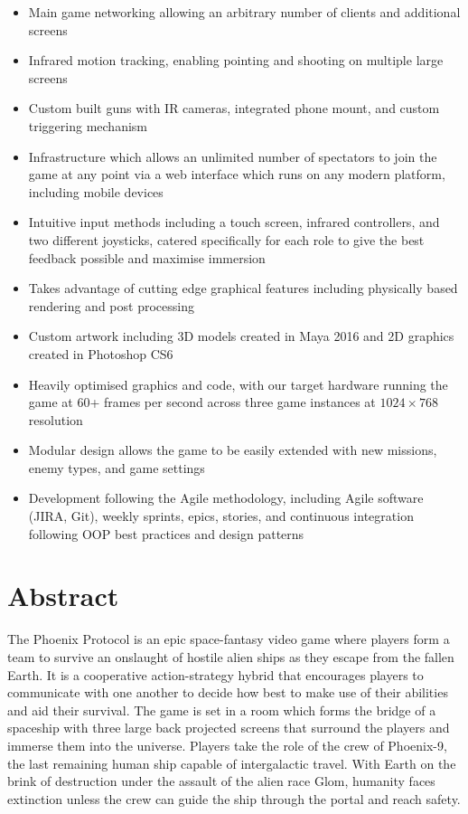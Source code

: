 \documentclass[a4paper,11pt]{article}
\begin{document}
\begin{itemize}
  \large

  \item Main game networking allowing an arbitrary number of clients and additional screens
  \item Infrared motion tracking, enabling pointing and shooting on multiple large screens
  \item Custom built guns with IR cameras, integrated phone mount, and custom triggering mechanism
  \item Infrastructure which allows an unlimited number of spectators to join the game at any point via a web interface which runs on any modern platform, including mobile devices
  \item Intuitive input methods including a touch screen, infrared controllers, and two different joysticks, catered specifically for each role to give the best feedback possible and maximise immersion 
  \item Takes advantage of cutting edge graphical features including physically based rendering and post processing
  \item Custom artwork including 3D models created in Maya 2016 and 2D graphics created in Photoshop CS6
  \item Heavily optimised graphics and code, with our target hardware running the game at 60+ frames per second across three game instances at $1024 \times 768$ resolution
    \item Modular design allows the game to be easily extended with new missions, enemy types, and game settings
  \item Development following the Agile methodology, including Agile software (JIRA, Git), weekly sprints, epics, stories, and continuous integration following OOP best practices and design patterns
\end{itemize}

\section{Abstract}
The Phoenix Protocol is an epic space-fantasy video game where players form a team to survive an onslaught of hostile alien ships as they escape from the fallen Earth. It is a cooperative action-strategy hybrid that encourages players to communicate with one another to decide how best to make use of their abilities and aid their survival. The game is set in a room which forms the bridge of a spaceship with three large back projected screens that surround the players and immerse them into the universe. 
Players take the role of the crew of Phoenix-9, the last remaining human ship capable of intergalactic travel. With Earth on the brink of destruction under the assault of the alien race Glom, humanity faces extinction unless the crew can guide the ship through the portal and reach safety.
\end{document}
